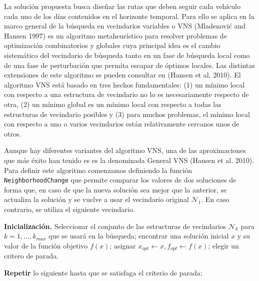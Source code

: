 \documentclass[
]{article}
\begin{document}
La solución propuesta busca diseñar las rutas que deben seguir cada
vehículo cada uno de los días contenidos en el horizonte temporal. Para
ello se aplica en la marco general de la búsqueda en vecindarios
variables o VNS (Mladenović and Hansen 1997) es un algoritmo
metaheurístico para resolver problemas de optimización combinatorios y
globales cuya principal idea es el cambio sistemático del vecindario de
búsqueda tanto en un fase de búsqueda local como de una fase de
perturbación que permita escapar de óptimos locales. Las distintas
extensiones de este algoritmo se pueden consultar en (Hansen et al.
2010). El algoritmo VNS está basado en tres hechos fundamentales: (1) un
mínimo local con respecto a una estructura de vecindario no lo es
necesariamente respecto de otra, (2) un mínimo global es un mínimo local
con respecto a todas las estructuras de vecindario posibles y (3) para
muchos problemas, el mínimo local con respecto a uno o varios
vecindarios están relativamente cercanos unos de otros.

Aunque hay diferentes variantes del algoritmo VNS, una de las
aproximaciones que más éxito han tenido es es la denominada General VNS
(Hansen et al. 2010). Para definir este algoritmo comenzamos definiendo
la función \texttt{NeighborhoodChange} que permite comparar los valores
de dos soluciones de forma que, en caso de que la nueva solución sea
mejor que la anterior, se actualiza la solución y se vuelve a usar el
vecindario original \(\mathcal{N}_1\). En caso contrario, se utiliza el
siguiente vecindario.

\textbf{Inicialización.} Seleccionar el conjunto de las estructuras de
vecindarios \(\mathcal{N}_k\) para \(k=1,\ldots, k_{max}\) que se usará
en la búsqueda; encontrar una solución inicial \(x\) y su valor de la
función objetivo \(f(x)\); asignar
\(x_{opt}\leftarrow x, f_{opt}\leftarrow f(x)\); elegir un critero de
parada.

\textbf{Repetir} lo siguiente hasta que se satisfaga el criterio de
parada:
\end{document}
